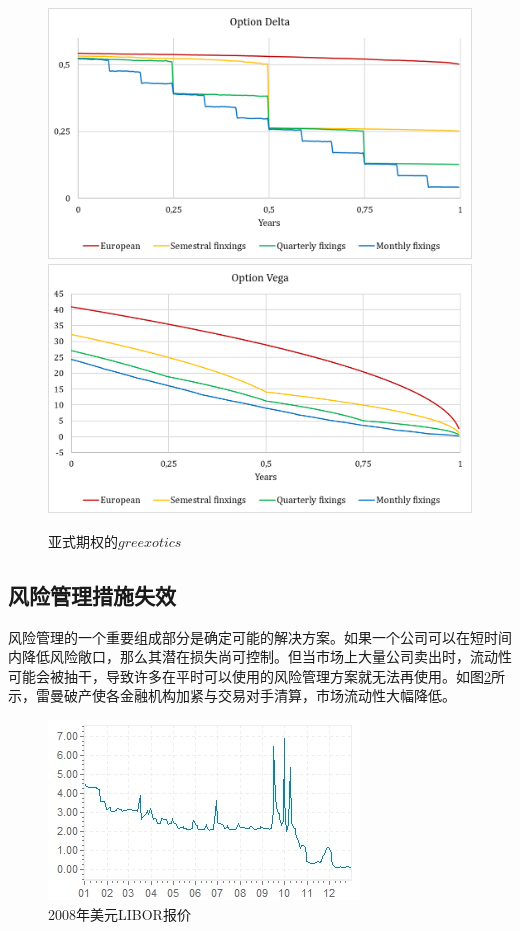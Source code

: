 \begin{figure}[H]
    \centering
    \includegraphics[width=\linewidth]{img/exo_delta.png}
    \includegraphics[width=\linewidth]{img/exo_vega.png}
    \caption{亚式期权的$greexotics$}
    \label{fig:asia}
\end{figure}

\subsection{风险管理措施失效}\label{sec:5}

风险管理的一个重要组成部分是确定可能的解决方案。如果一个公司可以在短时间内降低风险敞口，那么其潜在损失尚可控制。但当市场上大量公司卖出时，流动性可能会被抽干，导致许多在平时可以使用的风险管理方案就无法再使用。如图\ref{fig:libor}所示，雷曼破产使各金融机构加紧与交易对手清算，市场流动性大幅降低。
\begin{figure}[H]
    \includegraphics[width=\linewidth]{img/libor2008.jpg}
    \caption{2008年美元LIBOR报价}
    \label{fig:libor}
\end{figure}

